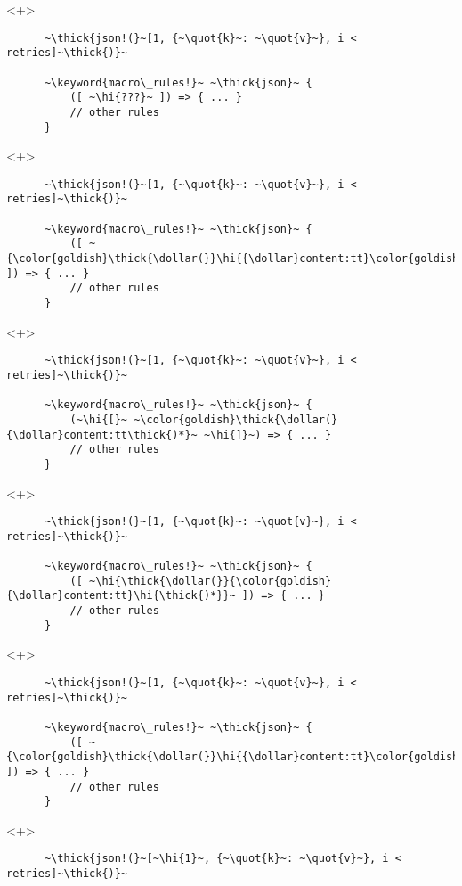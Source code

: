 \documentclass[usepdftitle=false]{beamer}
\newcommand{\dollar}{\makebox[\widthof{\$}][c]{\$}}
\newcommand{\thick}[1]{\contourlength{0.16pt}\contour[10]{black}{#1}}
\newcommand{\slantbox}[2][.5]
  {%
    \mbox
      {%
        \sbox{\foobox}{#2}%
        \hskip\wd\foobox
        \pdfsave
        \pdfsetmatrix{1 0 #1 1}%
        \llap{\usebox{\foobox}}%
        \pdfrestore
      }%
  }
\newcommand{\backslantbox}[2][.5]
  {%
    \mbox
      {%
        \sbox{\foobox}{#2}%
        \hskip\wd\foobox
        \pdfsave
        \pdfsetmatrix{-1 0 #1 1}%
        \llap{\usebox{\foobox}}%
        \pdfrestore
      }%
  }
\newcommand{\hi}[1]{%
\tikz[baseline=(A.base)]
 \node[highlighting=yellowbg,inner sep=0pt,text depth=0pt] (A) {#1};%
}
\newcommand{\openquote}{\backslantbox[.2]{\hspace{11pt}''\hspace{-11pt}}}
\newcommand{\closequote}{\slantbox[-.2]{\hspace{2pt}''\hspace{-2pt}}}
\newcommand{\blackquote}[1]{\openquote#1\closequote}
\newcommand{\quot}[1]{{\color{redish}\blackquote{#1}}}
\newcommand{\keyword}[1]{\color{greenish}#1}
\begin{document}
\begin{frame}[fragile]
  \begin{onlyenv}<+>
    \begin{verbatim}
      ~\thick{json!(}~[1, {~\quot{k}~: ~\quot{v}~}, i < retries]~\thick{)}~

      ~\keyword{macro\_rules!}~ ~\thick{json}~ {
          ([ ~\hi{???}~ ]) => { ... }
          // other rules
      }
    \end{verbatim}
  \end{onlyenv}
  \begin{onlyenv}<+>
    \begin{verbatim}
      ~\thick{json!(}~[1, {~\quot{k}~: ~\quot{v}~}, i < retries]~\thick{)}~

      ~\keyword{macro\_rules!}~ ~\thick{json}~ {
          ([ ~{\color{goldish}\thick{\dollar(}}\hi{{\dollar}content:tt}\color{goldish}\thick{)*}~ ]) => { ... }
          // other rules
      }
    \end{verbatim}
  \end{onlyenv}
  \begin{onlyenv}<+>
    \begin{verbatim}
      ~\thick{json!(}~[1, {~\quot{k}~: ~\quot{v}~}, i < retries]~\thick{)}~

      ~\keyword{macro\_rules!}~ ~\thick{json}~ {
          (~\hi{[}~ ~\color{goldish}\thick{\dollar(}{\dollar}content:tt\thick{)*}~ ~\hi{]}~) => { ... }
          // other rules
      }
    \end{verbatim}
  \end{onlyenv}
  \begin{onlyenv}<+>
    \begin{verbatim}
      ~\thick{json!(}~[1, {~\quot{k}~: ~\quot{v}~}, i < retries]~\thick{)}~

      ~\keyword{macro\_rules!}~ ~\thick{json}~ {
          ([ ~\hi{\thick{\dollar(}}{\color{goldish}{\dollar}content:tt}\hi{\thick{)*}}~ ]) => { ... }
          // other rules
      }
    \end{verbatim}
  \end{onlyenv}
  \begin{onlyenv}<+>
    \begin{verbatim}
      ~\thick{json!(}~[1, {~\quot{k}~: ~\quot{v}~}, i < retries]~\thick{)}~

      ~\keyword{macro\_rules!}~ ~\thick{json}~ {
          ([ ~{\color{goldish}\thick{\dollar(}}\hi{{\dollar}content:tt}\color{goldish}\thick{)*}~ ]) => { ... }
          // other rules
      }
    \end{verbatim}
  \end{onlyenv}
  \begin{onlyenv}<+>
    \vspace{-20.5pt}
    \begin{verbatim}
      ~\thick{json!(}~[~\hi{1}~, {~\quot{k}~: ~\quot{v}~}, i < retries]~\thick{)}~


\end{verbatim}
\end{onlyenv}
\end{frame}
\end{document}
